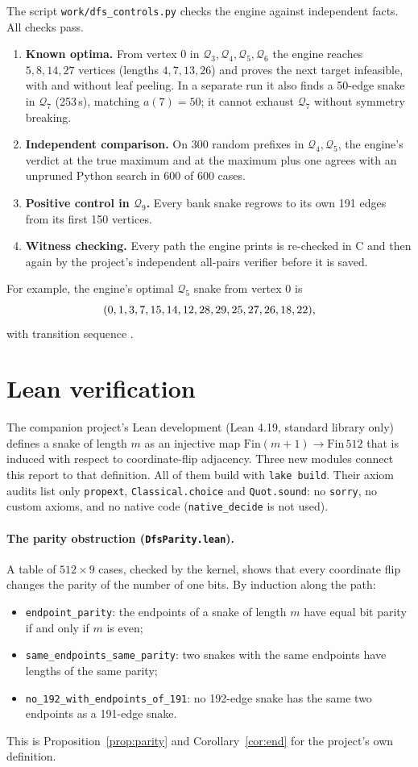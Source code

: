 \documentclass[11pt,a4paper]{article}
\theoremstyle{definition}
\newcommand{\Q}{\mathcal{Q}}
\begin{document}
The script \texttt{work/dfs\_controls.py} checks the engine against independent facts. All checks pass.
\begin{enumerate}[leftmargin=*]
\item \textbf{Known optima.} From vertex $0$ in $\Q_3,\Q_4,\Q_5,\Q_6$ the engine reaches $5,8,14,27$ vertices (lengths $4,7,13,26$) and proves the next target infeasible, with and without leaf peeling. In a separate run it also finds a 50-edge snake in $\Q_7$ (253\,s), matching $a(7)=50$; it cannot exhaust $\Q_7$ without symmetry breaking.
\item \textbf{Independent comparison.} On 300 random prefixes in $\Q_4,\Q_5$, the engine's verdict at the true maximum and at the maximum plus one agrees with an unpruned Python search in 600 of 600 cases.
\item \textbf{Positive control in $\Q_9$.} Every bank snake regrows to its own 191 edges from its first 150 vertices.
\item \textbf{Witness checking.} Every path the engine prints is re-checked in C and then again by the project's independent all-pairs verifier before it is saved.
\end{enumerate}
For example, the engine's optimal $\Q_5$ snake from vertex $0$ is
\[
(0, 1, 3, 7, 15, 14, 12, 28, 29, 25, 27, 26, 18, 22),
\]
with transition sequence \texttt{\QfiveTrans}.

\section{Lean verification}\label{sec:lean}

The companion project's Lean development (Lean 4.19, standard library only) defines a snake of length $m$ as an injective map $\mathrm{Fin}(m+1)\to\mathrm{Fin}\,512$ that is induced with respect to coordinate-flip adjacency. Three new modules connect this report to that definition. All of them build with \texttt{lake build}. Their axiom audits list only \texttt{propext}, \texttt{Classical.choice} and \texttt{Quot.sound}: no \texttt{sorry}, no custom axioms, and no native code (\texttt{native\_decide} is not used).

\paragraph{The parity obstruction (\texttt{DfsParity.lean}).} A table of $512\times9$ cases, checked by the kernel, shows that every coordinate flip changes the parity of the number of one bits. By induction along the path:
\begin{itemize}[leftmargin=*]
\item \texttt{endpoint\_parity}: the endpoints of a snake of length $m$ have equal bit parity if and only if $m$ is even;
\item \texttt{same\_endpoints\_same\_parity}: two snakes with the same endpoints have lengths of the same parity;
\item \texttt{no\_192\_with\_endpoints\_of\_191}: no 192-edge snake has the same two endpoints as a 191-edge snake.
\end{itemize}
This is Proposition~\ref{prop:parity} and Corollary~\ref{cor:end} for the project's own definition.
\end{document}
